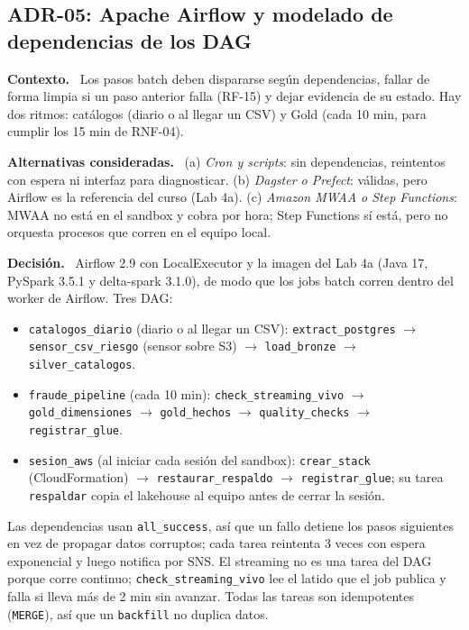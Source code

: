 \documentclass[12pt,letterpaper]{article}
\newcommand{\code}[1]{{\small\texttt{#1}}}
\newcommand{\adrpart}[1]{\textbf{#1.}~}
\begin{document}
\subsection*{ADR-05: Apache Airflow y modelado de dependencias de los DAG}

\adrpart{Contexto} Los pasos batch deben dispararse según dependencias, fallar de forma limpia si un paso anterior falla (RF-15) y dejar evidencia de su estado. Hay dos ritmos: catálogos (diario o al llegar un CSV) y Gold (cada 10 min, para cumplir los 15 min de RNF-04).

\adrpart{Alternativas consideradas} (a) \emph{Cron y scripts}: sin dependencias, reintentos con espera ni interfaz para diagnosticar. (b) \emph{Dagster o Prefect}: válidas, pero Airflow es la referencia del curso (Lab 4a). (c) \emph{Amazon MWAA o Step Functions}: MWAA no está en el sandbox y cobra por hora; Step Functions sí está, pero no orquesta procesos que corren en el equipo local.

\adrpart{Decisión} Airflow 2.9 con LocalExecutor y la imagen del Lab 4a (Java 17, PySpark 3.5.1 y delta-spark 3.1.0), de modo que los jobs batch corren dentro del worker de Airflow. Tres DAG:
\begin{itemize}\sloppy
  \item \code{catalogos\_diario} (diario o al llegar un CSV): \code{extract\_postgres} $\rightarrow$ \code{sensor\_csv\_riesgo} (sensor sobre S3) $\rightarrow$ \code{load\_bronze} $\rightarrow$ \code{silver\_catalogos}.
  \item \code{fraude\_pipeline} (cada 10 min): \code{check\_streaming\_vivo} $\rightarrow$ \code{gold\_dimensiones} $\rightarrow$ \code{gold\_hechos} $\rightarrow$ \code{quality\_checks} $\rightarrow$ \code{registrar\_glue}.
  \item \code{sesion\_aws} (al iniciar cada sesión del sandbox): \code{crear\_stack} (CloudFormation) $\rightarrow$ \code{restaurar\_respaldo} $\rightarrow$ \code{registrar\_glue}; su tarea \code{respaldar} copia el lakehouse al equipo antes de cerrar la sesión.
\end{itemize}
\noindent Las dependencias usan \code{all\_success}, así que un fallo detiene los pasos siguientes en vez de propagar datos corruptos; cada tarea reintenta 3 veces con espera exponencial y luego notifica por SNS. El streaming no es una tarea del DAG porque corre continuo; \code{check\_streaming\_vivo} lee el latido que el job publica y falla si lleva más de 2 min sin avanzar. Todas las tareas son idempotentes (\code{MERGE}), así que un \code{backfill} no duplica datos.
\end{document}
